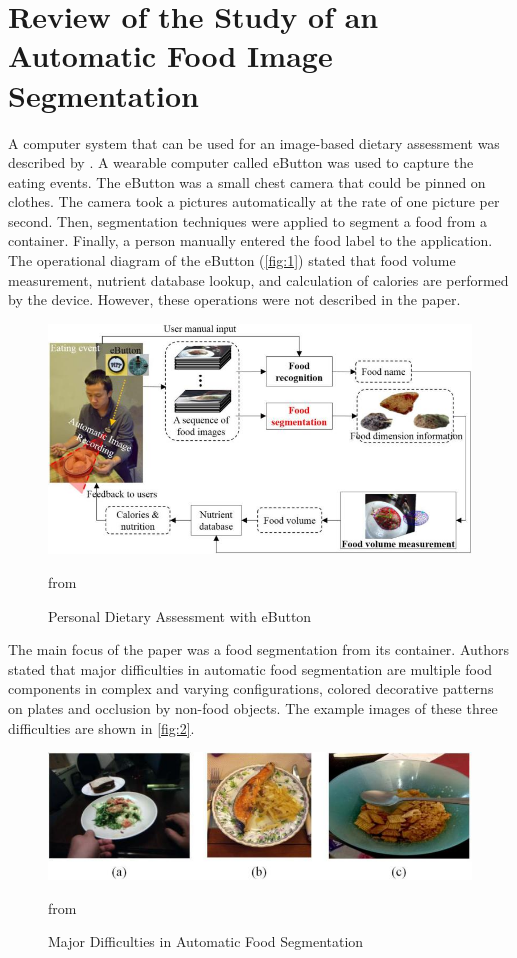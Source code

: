 \section{ Review of the  Study of an Automatic Food Image Segmentation }
A computer system that can be used for an image-based dietary assessment was described by \cite{chen2015saliency}. A wearable computer called eButton was used to capture the eating events. The eButton was a small chest camera that could be pinned on clothes. The camera took a pictures automatically at the rate of one picture per second. Then, segmentation techniques were applied to segment a food from a container. Finally, a person manually entered the food label to the application. The operational diagram of the eButton (\autoref{fig:1}) stated that food volume measurement, nutrient database lookup, and calculation of calories are performed by the device. However, these operations were not described in the paper. 

\begin{figure}[ht]
\centering
\includegraphics{Figures/segm_01.jpg}
\caption{Personal Dietary Assessment with eButton} from \citep{chen2015saliency} 
\label{fig:1}
\end{figure}

The main focus of the paper was a food segmentation from its container. Authors stated that major difficulties in automatic food segmentation are multiple food components in complex and varying configurations, colored decorative patterns on plates and occlusion by non-food objects. The example images of these three difficulties are shown in \autoref{fig:2}.

\begin{figure}[ht]
\centering
\includegraphics{Figures/segm_02.jpg}
\caption{Major Difficulties in Automatic Food Segmentation} from \citep{chen2015saliency}
\label{fig:2}
\end{figure}


